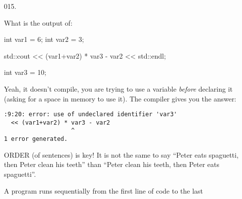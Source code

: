 \documentclass[]{book}
\newenvironment{Shaded}{}{}
\newcommand{\BuiltInTok}[1]{#1}
\newcommand{\DataTypeTok}[1]{\textcolor[rgb]{0.56,0.13,0.00}{#1}}
\newcommand{\DecValTok}[1]{\textcolor[rgb]{0.25,0.63,0.44}{#1}}
\newcommand{\NormalTok}[1]{#1}
\begin{document}
\begin{minipage}{\linewidth}\noindent
{\tiny 015.}\\
\begin{minipage}[t]{.485\linewidth}

What is the output of:

\begin{framed}

\begin{Shaded}
\begin{Highlighting}[]
\DataTypeTok{int}\NormalTok{ var1 = }\DecValTok{6}\NormalTok{;}
\DataTypeTok{int}\NormalTok{ var2 = }\DecValTok{3}\NormalTok{;}

\BuiltInTok{std::}\NormalTok{cout}
\NormalTok{  << (var1+var2) * var3 - var}\DecValTok{2}
\NormalTok{  << }\BuiltInTok{std::}\NormalTok{endl;}

\DataTypeTok{int}\NormalTok{ var3 = }\DecValTok{10}\NormalTok{;}
\end{Highlighting}
\end{Shaded}

\end{framed}

\end{minipage}
\hfill
\begin{minipage}[t]{.485\linewidth}

Yeah, it doesn't compile, you are trying to use a variable \emph{before}
declaring it (asking for a space in memory to use it). The compiler
gives you the answer:

\begin{framed}

\begin{verbatim}
:9:20: error: use of undeclared identifier 'var3'
  << (var1+var2) * var3 - var2
                   ^
1 error generated.
\end{verbatim}

\end{framed}

ORDER (of sentences) is key! It is not the same to say ``Peter eats
spaguetti, then Peter clean his teeth'' than ``Peter clean his teeth,
then Peter eats spaguetti''.

A program runs sequentially from the first line of code to the last

\end{minipage}
\end{minipage}

\vspace{2mm}\noindent\hrulefill{}
\end{document}
